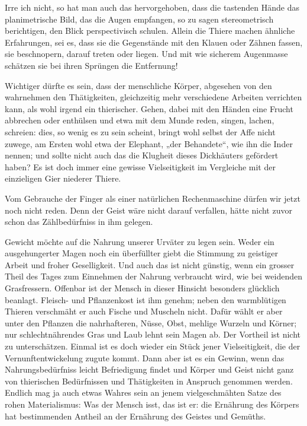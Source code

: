 Irre ich nicht, so hat man auch das hervorgehoben, dass die tastenden Hände das planimetrische Bild, das die Augen empfangen, so zu sagen stereometrisch berichtigen, den Blick perspectivisch schulen. Allein die Thiere machen ähnliche Erfahrungen, sei es, dass sie die Gegenstände mit den Klauen oder  Zähnen fassen, sie beschnopern, darauf treten oder liegen. Und mit wie sicherem Augenmasse schätzen sie bei ihren Sprüngen die Entfernung!

Wichtiger dürfte es sein, dass der menschliche Körper, abgesehen von den wahrnehmen den Thätigkeiten, gleichzeitig mehr verschiedene Arbeiten verrichten kann, als wohl irgend ein thierischer. Gehen, dabei mit den Händen eine Frucht abbrechen oder enthülsen und etwa mit dem Munde reden, singen, lachen, schreien: dies, so wenig es zu sein scheint, bringt wohl selbst der Affe nicht zuwege, am Ersten wohl etwa der Elephant, „der Behandete“, wie ihn die Inder nennen; und sollte nicht auch das die Klugheit dieses Dickhäuters gefördert haben? Es ist doch \label{fp.296} immer eine gewisse Vielseitigkeit im Vergleiche mit der einzieligen Gier niederer Thiere.

Vom Gebrauche der Finger als einer natürlichen Rechenmaschine dürfen wir jetzt noch nicht reden. Denn der Geist wäre nicht darauf verfallen, hätte nicht zuvor schon das Zählbedürfniss in ihm gelegen.

Gewicht möchte auf die Nahrung unserer Urväter zu legen sein. Weder ein ausgehungerter Magen noch ein überfüllter giebt die Stimmung zu geistiger \label{sp.306} Arbeit und froher Geselligkeit. Und auch das ist nicht günstig, wenn ein grosser Theil des Tages zum Einnehmen der Nahrung verbraucht wird, wie bei weidenden Grasfressern. Offenbar ist der Mensch in dieser Hinsicht besonders glücklich beanlagt. Fleisch- und Pflanzenkost ist ihm genehm; neben den warmblütigen Thieren verschmäht er auch Fische und Muscheln nicht. Dafür wählt er aber unter den Pflanzen die nahrhafteren, Nüsse, Obst, mehlige Wurzeln und Körner; nur schlechtnährendes Gras und Laub lehnt sein Magen ab. Der Vortheil ist nicht zu unterschätzen. Einmal ist es doch wieder ein Stück jener Vielseitigkeit, die der Vernunftentwickelung zugute kommt. Dann aber ist es ein Gewinn, wenn das Nahrungsbedürfniss leicht Befriedigung findet und Körper und Geist nicht ganz von thierischen Bedürfnissen und Thätigkeiten in Anspruch genommen werden. Endlich mag ja auch etwas Wahres sein an jenem vielgeschmähten Satze des rohen Materialismus: Was der Mensch isst, das ist er: die Ernährung des Körpers hat bestimmenden Antheil an der Ernährung des Geistes und Gemüths.

